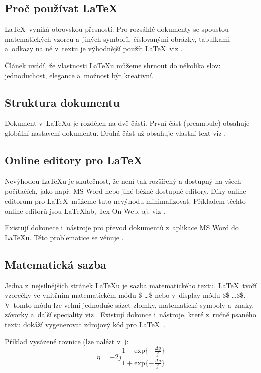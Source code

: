 \documentclass[a4paper, 11pt]{article}
\begin{document}
	\subsection{Proč používat \LaTeX}
	\LaTeX\ vyniká obrovskou přesností. Pro rozsáhlé dokumenty se spoustou matematických vzorců a~jiných symbolů,
	číslovanými obrázky, tabulkami a~odkazy na ně v~textu je výhodnější použít \LaTeX\ viz \cite{Martinek2010}.

	Článek \cite{Simecek2013} uvádí, že vlastnosti {\LaTeX}u můžeme shrnout do několika slov: jednoduchost,
	elegance a~možnost být kreativní.


	\subsection{Struktura dokumentu}
	Dokument v~{\LaTeX}u je rozdělen na dvě části. První část (preambule) obsahuje globální nastavení dokumentu.
	Druhá část už obsahuje vlastní text viz \cite{Svamberg2001}.


	\subsection{Online editory pro \LaTeX}
	Nevýhodou {\LaTeX}u je skutečnost, že není tak rozšířený a dostupný na všech počítačích, jako např. MS Word
	nebo jiné běžně dostupné editory. Díky online editorům pro \LaTeX\ můžeme tuto nevýhodu minimalizovat. Příkladem
	těchto online editorů jsou {\LaTeX}lab, Tex-On-Web, aj. viz \cite{Sokol2012}.

	Existují dokonece i~nástroje pro převod dokumentů z~aplikace MS Word do {\LaTeX}u. Této problematice se věnuje
	\cite{Simek2009}.


	\subsection{Matematická sazba}
	Jedna z~nejsilnějších stránek {\LaTeX}u je sazba matematického textu. \LaTeX\ tvoří vzorečky ve vnitřním
	matematickém módu \$ \ldots \$ nebo v~display módu \$\$ \ldots \$\$. V~tomto módu lze velmi jednoduše
	sázet zlomky, matematické symboly a~znaky, závorky a~další speciality viz \cite{Olsak2014}. Existují
	dokonce i~nástroje, které z~ručně psaného textu dokáží vygenerovat zdrojový kód pro \LaTeX\
	\cite{Oksuz2008}.

	Příklad vysázené rovnice (lze nalézt v~\cite{CazarezCastro2012}):
	$$
		\eta = -2j \frac{1 - \mathrm{exp}\{ - \frac{\Delta q}{j} \}}{1 + \mathrm{exp}\{ - \frac{\Delta q}{j} \}}
	$$


	\newpage
	
	\renewcommand{\refname}{Literatura}
	
\end{document}
